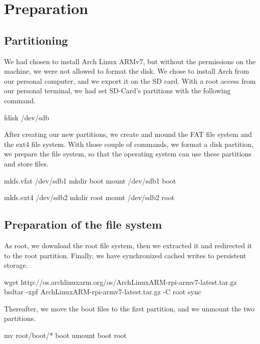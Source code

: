\documentclass[11pt]{article}
\begin{document}
\section{Preparation}
\subsection{Partitioning}

We had chosen to install Arch Linux ARMv7, but without the permissions on the machine, we were not allowed to format the disk. We chose to install Arch from our personal computer, and we export it on the SD card. With a root access from our personal terminal, we had set SD-Card’s partitions with the following command.

\begin{bash}
    fdisk /dev/sdb
\end{bash}

After creating our new partitions, we create and mound the FAT file system and the ext4 file system. With those couple of commands, we format a disk partition, we prepare the file system, so that the operating system can use these partitions and store files.

\begin{bash}
    mkfs.vfat /dev/sdb1
    mkdir boot
    mount /dev/sdb1 boot
\end{bash}

\begin{bash}
    mkfs.ext4 /dev/sdb2
    mkdir root
    mount /dev/sdb2 root
\end{bash}

\subsection{Preparation of the file system}
As root, we download the root file system, then we extracted it and redirected it to the root partition. Finally, we have synchronized cached writes to persistent storage.
\begin{bash}
    wget http://os.archlinuxarm.org/os/ArchLinuxARM-rpi-armv7-latest.tar.gz
    bsdtar -xpf ArchLinuxARM-rpi-armv7-latest.tar.gz -C root
    sync
\end{bash}

Thereafter, we move the boot files to the first partition, and we unmount the two partitions.
\begin{bash}
    mv root/boot/* boot
    umount boot root
\end{bash}
\end{document}

